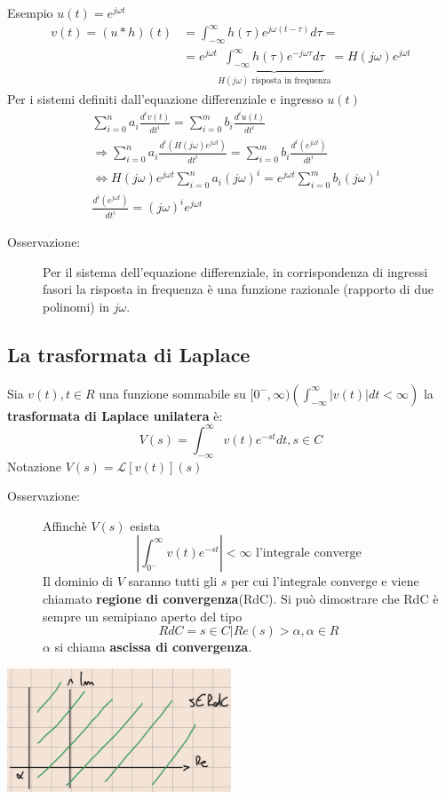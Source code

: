 \documentclass[a4paper, 12pt]{book}
\theoremstyle{plain}
\begin{document}
Esempio $u(t) = e^{j \omega t}$
\[
    \begin{split}
        v(t) = (u \ast h) (t) &= \int_{-\infty}^\infty h(\tau)  e^{j \omega (t - \tau)} d \tau = \\
        &= e^{j \omega t} \underbrace{\int_{-\infty}^\infty h(\tau)  e^{-j \omega \tau} d \tau}_{H(j \omega) \textrm{ risposta in frequenza}} = H(j \omega) e^{j \omega t}
    \end{split}
\]
Per i sistemi definiti dall'equazione differenziale e ingresso $u(t)$
\[
    \begin{split}
        &\sum_{i = 0}^n a_i \frac{d^iv(t)}{dt^i} = \sum_{i = 0}^m b_i \frac{d^iu(t)}{dt^i} \\
        &\Rightarrow \sum_{i = 0}^n a_i \frac{d^i (H(j \omega) e^{j \omega t})}{dt^i} = \sum_{i = 0}^m b_i \frac{d^i (e^{j \omega t})}{dt^i} \\
        &\Leftrightarrow H(j \omega) e^{j \omega t} \sum_{i = 0}^n a_i (j \omega)^i =  e^{j \omega t} \sum_{i = 0}^m b_i (j \omega)^i \\
        &\frac{d^i (e^{j \omega t})}{dt^i} = (j \omega)^i e^{j \omega t}
    \end{split}
\]
\begin{description}
    \item[Osservazione:] Per il sistema dell'equazione differenziale, in corrispondenza di ingressi fasori la risposta in 
    frequenza è una funzione razionale (rapporto di due polinomi) in $j\omega$. 
\end{description}

\subsection{La trasformata di Laplace}

Sia $v(t), t \in R$ una funzione sommabile su $[0^-, \infty)(\int_{-\infty}^\infty |v(t)| dt < \infty)$ la \textbf{trasformata 
di Laplace unilatera} è:
\[
    V(s) = \int_{-\infty}^\infty v(t) e^{-st} dt, s \in C
\]
Notazione $V(s) = \mathcal{L} [v(t)](s)$
\begin{description}
    \item[Osservazione:] Affinchè $V(s)$ esista \[ |\int_{0^-}^\infty v(t) e^{-st}| < \infty \textrm{ l'integrale converge} \] 
    Il dominio di $V$ saranno tutti gli $s$ per cui l'integrale converge e viene chiamato \textbf{regione di convergenza}(RdC).
    Si può dimostrare che RdC è sempre un semipiano aperto del tipo \[ RdC = {s \in C | Re(s) > \alpha}, \alpha \in R \] $\alpha$ 
    si chiama \textbf{ascissa di convergenza}.  
\end{description}
\begin{center}
    \includegraphics[width=0.5\textwidth]{RdC.png}
\end{center}
\end{document}
